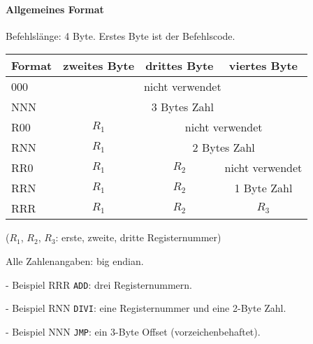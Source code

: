 \begin{frame}{\insertsubsection}
\framesubtitle{Allgemeines Format}
 Befehlslänge: 4 Byte. Erstes Byte ist der Befehlscode.
 \begin{center}
  
 \end{center} 
\end{frame}


\begin{frame}{\insertsubsection}
 \begin{center}
  \begin{tabular}{l||c|c|c}
    \toprule
    Format & zweites Byte  & drittes Byte  & viertes Byte \\\toprule
    000 & \multicolumn{3}{c}{nicht verwendet}           \\\midrule
    NNN & \multicolumn{3}{c}{3 Bytes Zahl}              \\\midrule
    R00 & $R_{1}$ & \multicolumn{2}{c}{nicht verwendet} \\\midrule
    RNN & $R_{1}$ & \multicolumn{2}{c}{2 Bytes Zahl}    \\\midrule
    RR0 & $R_{1}$ & $R_{2}$ &  nicht verwendet          \\\midrule
    RRN & $R_{1}$ & $R_{2}$ &  1 Byte Zahl              \\\midrule
    RRR & $R_{1}$ & $R_{2}$ & $R_{3}$                   \\\bottomrule
  \end{tabular}
\end{center}
($R_{1}$, $R_{2}$, $R_{3}$: erste, zweite, dritte Registernummer)

Alle Zahlenangaben: big endian.
\end{frame}



\begin{frame}{\insertsubsection{} - Beispiel RRR}
 \texttt{ADD}: drei Registernummern.
 \begin{center}
  
 \end{center}
\end{frame}

\begin{frame}{\insertsubsection{} - Beispiel RNN}
 \texttt{DIVI}: eine Registernummer und eine 2-Byte Zahl.
 \begin{center}
  
 \end{center}
\end{frame}

\begin{frame}{\insertsubsection{} - Beispiel NNN}
 \texttt{JMP}: ein 3-Byte Offset (vorzeichenbehaftet).
 \begin{center}
  
 \end{center}
\end{frame}

